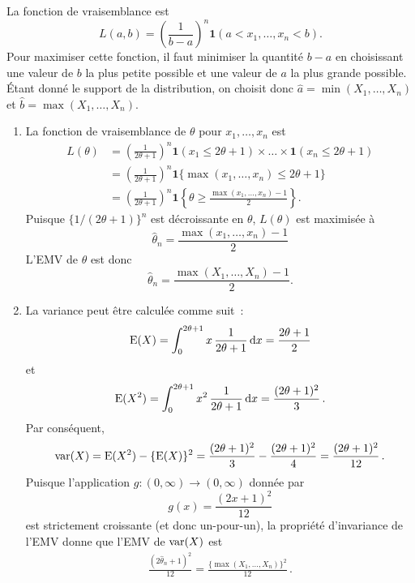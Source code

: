 \begin{solution}{4.13}
    La fonction de vraisemblance est
    \begin{equation*}
      L(a, b) = \left( \frac{1}{b - a} \right)^n\mathbf{1}(a < x_1, \dots, x_n < b).
    \end{equation*}
    Pour maximiser cette fonction, il
    faut minimiser la quantité $b - a$ en choisissant une valeur de
    $b$ la plus petite possible et une valeur de $a$ la plus grande
    possible. Étant donné le support de la distribution, on choisit
    donc $\hat{a} = \min(X_1, \dots, X_n)$ et $\hat{b} = \max(X_1,
    \dots, X_n)$.
  
\end{solution}
\begin{solution}{4.14}
\begin{enumerate}
\item La fonction de vraisemblance de $\theta$ pour $x_1,\dots, x_n$ est
\begin{align*}
L(\theta) &= \left(\frac{1}{2 \theta + 1}\right)^n \boldsymbol{1}(x_1 \le 2 \theta + 1) \times \dots \times\boldsymbol{1}(x_n \le 2 \theta + 1)\\
& = \left(\frac{1}{2 \theta + 1}\right)^n \boldsymbol{1}\{\max(x_1,\dots,x_n) \le 2 \theta + 1\}\\
& = \left(\frac{1}{2 \theta + 1}\right)^n \boldsymbol{1}\left\{  \theta \ge \frac{\max(x_1,\dots,x_n) -1}{2}\right\}.
\end{align*}
Puisque $\{1/(2\theta+1)\}^n$ est décroissante en $\theta$, $L(\theta)$ est maximisée à
$$
\hat \theta_n = \frac{\max(x_1,\dots,x_n) -1}{2}
$$
L'EMV de $\theta$ est donc
$$
\hat \theta_n = \frac{\max(X_1,\dots,X_n) -1}{2}.
$$

\item La variance peut être calculée comme suit~:
$$
\operatorname{E}(X) = \int_0^{2\theta  +1} x \, \frac{1}{2\theta + 1} \, \mbox{d} x = \frac{2 \theta  +1}{2}
$$
et
$$
\operatorname{E}(X^2) =  \int_0^{2\theta  +1} x^2 \, \frac{1}{2\theta + 1} \, \mbox{d}x = \frac{(2\theta + 1)^2}{3} \, .
$$
Par conséquent,
$$
\operatorname{var}(X) = \operatorname{E}(X^2) - \{\operatorname{E}(X)\}^2 = \frac{(2\theta + 1)^2}{3}- \frac{(2\theta + 1)^2}{4} = \frac{(2\theta + 1)^2}{12} \, .
$$
Puisque l'application $g : (0,\infty) \to (0,\infty)$ donnée par
$$
g(x) = \frac{(2x + 1)^2}{12}
$$
est strictement croissante (et donc un-pour-un), la propriété d'invariance de l'EMV donne que l'EMV de $\operatorname{var}(X)$ est
\begin{align*}
\frac{(2\hat\theta_n + 1)^2}{12} = \frac{\{\max(X_1,\dots,X_n)\}^2}{12} \, .
\end{align*}

\end{enumerate}
\end{solution}
